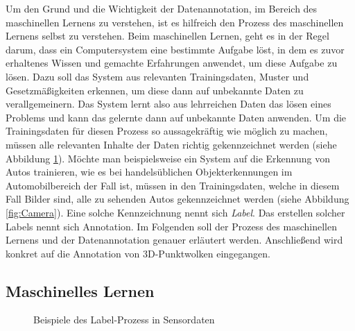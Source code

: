 Um den Grund und die Wichtigkeit der Datenannotation, im Bereich des maschinellen Lernens zu verstehen, ist es hilfreich den Prozess des maschinellen Lernens selbst zu verstehen. Beim maschinellen Lernen, geht es in der Regel darum, dass ein Computersystem eine bestimmte Aufgabe löst, in dem es zuvor erhaltenes Wissen und gemachte Erfahrungen anwendet, um diese Aufgabe zu lösen. Dazu soll das System aus relevanten Trainingsdaten, Muster und Gesetzmäßigkeiten erkennen, um diese dann auf unbekannte Daten zu verallgemeinern. Das System lernt also aus lehrreichen Daten das lösen eines Problems und kann das gelernte dann auf unbekannte Daten anwenden. Um die Trainingsdaten für diesen Prozess so aussagekräftig wie möglich zu machen, müssen alle relevanten Inhalte der Daten richtig gekennzeichnet werden (siehe Abbildung \ref{fig:ObjectDetection}). Möchte man beispielsweise ein System auf die Erkennung von Autos trainieren, wie es bei handelsüblichen Objekterkennungen im Automobilbereich der Fall ist, müssen in den Trainingsdaten, welche in diesem Fall Bilder sind, alle zu sehenden Autos gekennzeichnet werden (siehe Abbildung \ref{fig:Camera}). Eine solche Kennzeichnung nennt sich \textit{Label}. Das erstellen solcher Labels nennt sich Annotation. Im Folgenden soll der Prozess des maschinellen Lernens und der Datenannotation genauer erläutert werden. Anschließend wird konkret auf die Annotation von 3D-Punktwolken eingegangen.

\subsection{Maschinelles Lernen}
\label{sec:MLearning}

\begin{figure}%
    \centering
    \quad
    \caption{Beispiele des Label-Prozess in Sensordaten}\label{fig:ObjectDetection}%
\end{figure}

